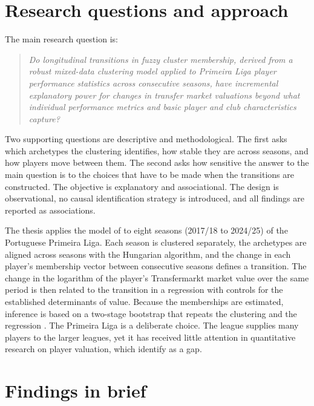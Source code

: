 \section{Research questions and approach}

The main research question is:
\begin{quote}
\emph{Do longitudinal transitions in fuzzy cluster membership, derived from a robust mixed-data clustering model applied to Primeira Liga player performance statistics across consecutive seasons, have incremental explanatory power for changes in transfer market valuations beyond what individual performance metrics and basic player and club characteristics capture?}
\end{quote}
Two supporting questions are descriptive and methodological. The first asks which archetypes the clustering identifies, how stable they are across seasons, and how players move between them. The second asks how sensitive the answer to the main question is to the choices that have to be made when the transitions are constructed. The objective is explanatory and associational. The design is observational, no causal identification strategy is introduced, and all findings are reported as associations.

The thesis applies the model of  to eight seasons (2017/18 to 2024/25) of the Portuguese Primeira Liga. Each season is clustered separately, the archetypes are aligned across seasons with the Hungarian algorithm, and the change in each player's membership vector between consecutive seasons defines a transition. The change in the logarithm of the player's Transfermarkt market value over the same period is then related to the transition in a regression with controls for the established determinants of value. Because the memberships are estimated, inference is based on a two-stage bootstrap that repeats the clustering and the regression \cite{pagan1984econometric}. The Primeira Liga is a deliberate choice. The league supplies many players to the larger leagues, yet it has received little attention in quantitative research on player valuation, which  identify as a gap.

\section{Findings in brief}

